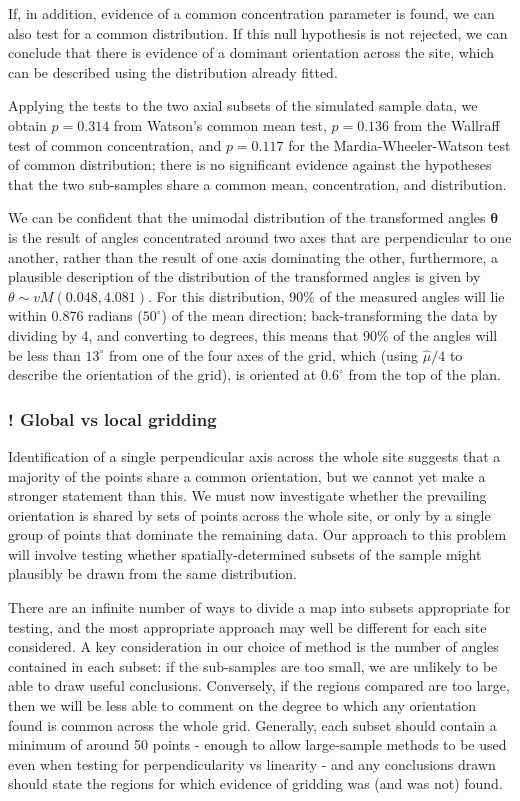 \documentclass[../../ArchStats.tex]{subfiles}
\begin{document}
If, in addition, evidence of a common concentration parameter is found, we can also test for a common distribution. If this null hypothesis is not rejected, we can conclude that there is evidence of a dominant orientation across the site, which can be described using the distribution already fitted.

Applying the tests to the two axial subsets of the simulated sample data, we obtain $p = 0.314$ from Watson's common mean test, $p=0.136$ from the Wallraff test of common concentration, and $p = 0.117$ for the Mardia-Wheeler-Watson test of common distribution; there is no significant evidence against the hypotheses that the two sub-samples share a common mean, concentration, and distribution.

We can be confident that the unimodal distribution of the transformed angles $\boldsymbol{\theta}$ is the result of angles concentrated around two axes that are perpendicular to one another, rather than the result of one axis dominating the other, furthermore, a plausible description of the distribution of the transformed angles is given by $\theta \sim vM(0.048, 4.081)$. For this distribution, 90\% of the measured angles will lie within 0.876 radians ($50^\circ$) of the mean direction; back-transforming the data by dividing by 4, and converting to degrees, this means that 90\% of the angles will be less than $13^\circ$ from one of the four axes of the grid, which (using $\hat{\mu}/4$ to describe the orientation of the grid), is oriented at $0.6^\circ$ from the top of the plan. 


\subsubsection{! Global vs local gridding}
\label{sec:global-gridding}

Identification of a single perpendicular axis across the whole site suggests that a majority of the points share a common orientation, but we cannot yet make a stronger statement than this. We must now investigate whether the prevailing orientation is shared by sets of points across the whole site, or only by a single group of points that dominate the remaining data. Our approach to this problem will involve testing whether spatially-determined subsets of the sample might plausibly be drawn from the same distribution.

There are an infinite number of ways to divide a map into subsets appropriate for testing, and the most appropriate approach may well be different for each site considered. A key consideration in our choice of method is the number of angles contained in each subset: if the sub-samples are too small, we are unlikely to be able to draw useful conclusions. Conversely, if the regions compared are too large, then we will be less able to comment on the degree to which any orientation found is common across the whole grid. Generally, each subset should contain a minimum of around 50 points - enough to allow large-sample methods to be used even when testing for perpendicularity vs linearity - and any conclusions drawn should state the regions for which evidence of gridding was (and was not) found.
\end{document}

